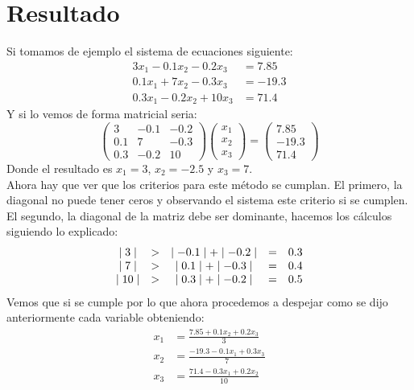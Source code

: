 \documentclass[12pt]{article}
\begin{document}
		\section*{\centering Resultado}\label{sec:Resultado}
			Si tomamos de ejemplo el sistema de ecuaciones siguiente:
			\begin{align*}
				3x_1 - 0.1x_2 - 0.2x_3 &= 7.85 \\
				0.1x_1 + 7x_2 - 0.3x_3 &= -19.3 \\
				0.3x_1 - 0.2x_2 + 10x_3 &= 71.4
			\end{align*}
			Y  si lo vemos de forma matricial seria:
			$$
			\left(\begin{array}{ccc}
				3 & -0.1 & -0.2 \\
				0.1 & 7 & -0.3 \\
				0.3 & -0.2 & 10
			\end{array}\right)
			\left(\begin{array}{c}
				x_1 \\
				x_2 \\
				x_3 
			\end{array}\right)
			   =
			\left(\begin{array}{c}
			 7.85 \\
			 -19.3 \\
			 71.4 
			\end{array}\right)
			$$
			Donde el resultado es $ x_1 = 3 $, $ x_2 = -2.5 $ y $ x_3 = 7 $.\\
			Ahora hay que ver que los criterios para este método se cumplan. El primero, la diagonal no puede tener ceros y 
			observando el sistema este criterio si se cumplen. El segundo, la diagonal de la matriz debe ser dominante, hacemos 
			los cálculos siguiendo lo explicado:
			$$
			\begin{array}{c c c c c c}
				\mid 3 \mid & > & \mid -0.1 \mid + \mid -0.2 \mid & = & 0.3 \\
				\mid 7 \mid & > & \mid 0.1 \mid + \mid -0.3 \mid & = & 0.4 \\
				\mid 10 \mid & > & \mid 0.3 \mid + \mid -0.2 \mid & = & 0.5 
			\end{array}
			$$
			Vemos que si se cumple por lo que ahora procedemos a despejar como se dijo anteriormente cada variable obteniendo:
			\begin{align*}
				x_1 &= \frac{7.85 + 0.1x_2 + 0.2x_3}{3} \\
				x_2 &= \frac{-19.3 - 0.1x_1 + 0.3x_3}{7} \\
				x_3 &= \frac{71.4 - 0.3x_1 + 0.2x_2}{10}
			\end{align*}
\end{document}
